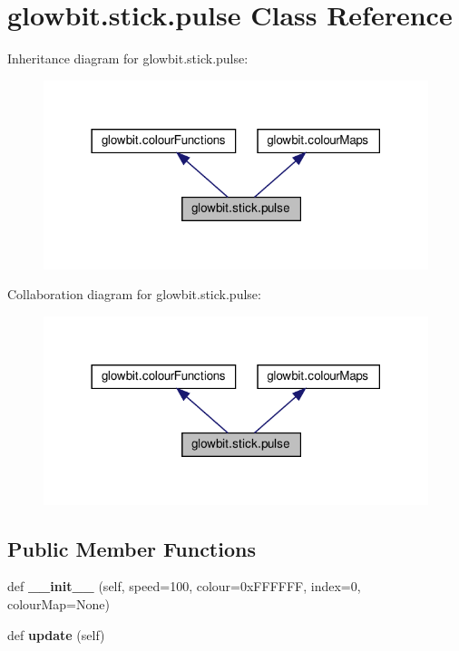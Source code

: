 \hypertarget{classglowbit_1_1stick_1_1pulse}{}\section{glowbit.\+stick.\+pulse Class Reference}
\label{classglowbit_1_1stick_1_1pulse}


Inheritance diagram for glowbit.\+stick.\+pulse\+:\nopagebreak
\begin{figure}[H]
\begin{center}
\leavevmode
\includegraphics[width=318pt]{classglowbit_1_1stick_1_1pulse__inherit__graph}
\end{center}
\end{figure}


Collaboration diagram for glowbit.\+stick.\+pulse\+:\nopagebreak
\begin{figure}[H]
\begin{center}
\leavevmode
\includegraphics[width=318pt]{classglowbit_1_1stick_1_1pulse__coll__graph}
\end{center}
\end{figure}
\subsection*{Public Member Functions}
\begin{DoxyCompactItemize}
\item 
\mbox{\label{classglowbit_1_1stick_1_1pulse_a7fe0830311db4a98b676aaef89fb0f09}} 
def {\bfseries \+\_\+\+\_\+init\+\_\+\+\_\+} (self, speed=100, colour=0x\+F\+F\+F\+F\+F\+F, index=0, colour\+Map=\+None)
\item 
\mbox{\label{classglowbit_1_1stick_1_1pulse_afaa11b5cae0a3467836d9654f50f97e7}} 
def {\bfseries update} (self)
\end{DoxyCompactItemize}
